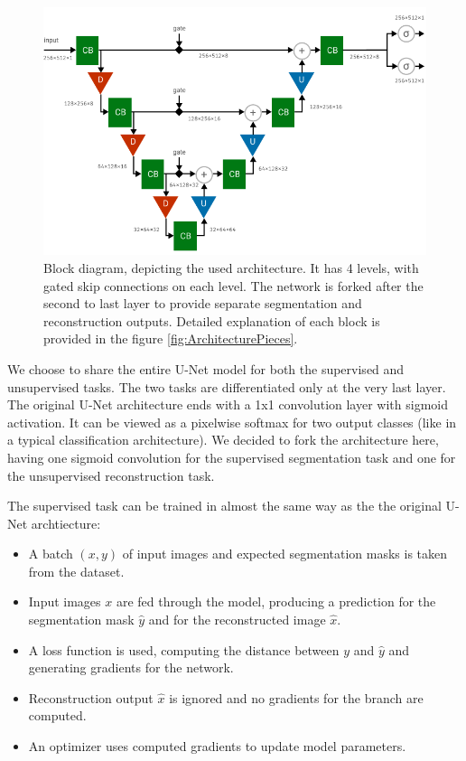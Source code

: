 \begin{figure}[ht]
    \centering
    \includegraphics[width=145mm]{../img/architecture-complete.pdf}
    \caption{Block diagram, depicting the used architecture. It has 4 levels, with gated skip connections on each level. The network is forked after the second to last layer to provide separate segmentation and reconstruction outputs. Detailed explanation of each block is provided in the figure \ref{fig:ArchitecturePieces}.}
    \label{fig:ArchitectureCombined}
\end{figure}

We choose to share the entire U-Net model for both the supervised and unsupervised tasks. The two tasks are differentiated only at the very last layer. The original U-Net architecture ends with a 1x1 convolution layer with sigmoid activation. It can be viewed as a pixelwise softmax for two output classes (like in a typical classification architecture). We decided to fork the architecture here, having one sigmoid convolution for the supervised segmentation task and one for the unsupervised reconstruction task.

The supervised task can be trained in almost the same way as the the original U-Net archtiecture:

\begin{itemize}
    \item A batch $(x, y)$ of input images and expected segmentation masks is taken from the dataset.
    \item Input images $x$ are fed through the model, producing a prediction for the segmentation mask $\hat{y}$ and for the reconstructed image $\hat{x}$.
    \item A loss function is used, computing the distance between $y$ and $\hat{y}$ and generating gradients for the network.
    \item Reconstruction output $\hat{x}$ is ignored and no gradients for the branch are computed.
    \item An optimizer uses computed gradients to update model parameters.
\end{itemize}

